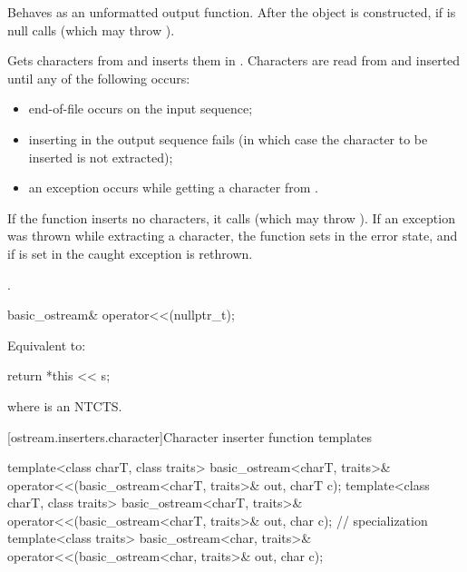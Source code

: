 \begin{itemdescr}
\pnum
\effects
Behaves as an unformatted output function.
After the  object is
constructed, if
 is null calls
(which may throw
).

\pnum
Gets characters from 
and inserts them in
.
Characters are read from 
and inserted until any of the following occurs:
\begin{itemize}
\item
end-of-file occurs on the input sequence;
\item
inserting in the output sequence fails
(in which case the character to be inserted is not extracted);
\item
an exception occurs while getting a character from .
\end{itemize}

\pnum
If the function inserts no characters, it calls
(which may throw
).
If an exception was thrown while extracting a character,
the function sets
in the error state, and if
is set in
the caught exception is rethrown.

\pnum
\returns
{}.
\end{itemdescr}

%
\begin{itemdecl}
basic_ostream& operator<<(nullptr_t);
\end{itemdecl}

\begin{itemdescr}
\pnum
\effects
Equivalent to:
\begin{codeblock}
return *this << s;
\end{codeblock}
where  is an
NTCTS.
\end{itemdescr}

[ostream.inserters.character]{Character inserter function templates}

%
\begin{itemdecl}
template<class charT, class traits>
  basic_ostream<charT, traits>& operator<<(basic_ostream<charT, traits>& out, charT c);
template<class charT, class traits>
  basic_ostream<charT, traits>& operator<<(basic_ostream<charT, traits>& out, char c);
// specialization
template<class traits>
  basic_ostream<char, traits>& operator<<(basic_ostream<char, traits>& out, char c);
\end{itemdecl}

